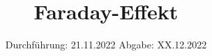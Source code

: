 

\subject{Versuch Nr.V46}
\title{Faraday-Effekt}
\date{%
  Durchführung: 21.11.2022
  \hspace{3em}
  Abgabe: XX.12.2022
}



\maketitle
\thispagestyle{empty}
\tableofcontents
\newpage 






%

\nocite{*}

\printbibliography{}


